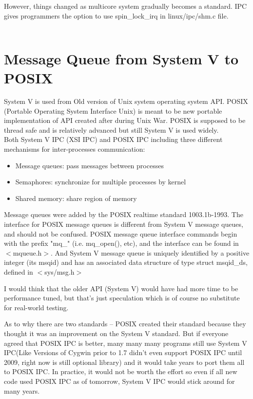 \documentclass[10pt,preprint]{sigplanconf}
\begin{document}
However, things changed as multicore system gradually becomes a standard. IPC gives programmers the option to use spin\_lock\_irq in linux/ipc/shm.c file.\\\\

\section{Message Queue from System V to POSIX}

System V is used from Old version of Unix system operating system API. POSIX (Portable Operating System Interface Unix) is meant to be new portable implementation of API created after during Unix War. POSIX is supposed to be thread safe and is relatively advanced but still System V is used widely.\\
Both System V IPC (XSI IPC) and POSIX IPC including three different mechanisms for inter-processes communication:
\begin{itemize}
	\item Message queues: pass messages between processes
	\item Semaphores: synchronize for multiple processes by kernel
	\item Shared memory: share region of memory
\end{itemize}
Message queues were added by the POSIX realtime standard 1003.1b-1993. The interface for POSIX message queues is different from System V message queues, and should not be confused. POSIX message queue interface commands begin with the prefix "mq\_" (i.e. mq\_open(), etc), and the interface can be found in $<$mqueue.h$>$. And System V message queue is uniquely identified by a positive integer (its msqid) and has an associated data structure of type struct msqid\_ds, defined in $<$sys/msg.h$>$

I would think that the older API (System V) would have had more time to be performance tuned, but that's just speculation which is of course no substitute for real-world testing.

As to why there are two standards -- POSIX created their standard because they thought it was an improvement on the System V standard. But if everyone agreed that POSIX IPC is better, many many many programs still use System V IPC(Like Versions of Cygwin prior to 1.7 didn't even support POSIX IPC until 2009, right now is still optional library) and it would take years to port them all to POSIX IPC. In practice, it would not be worth the effort so even if all new code used POSIX IPC as of tomorrow, System V IPC would stick around for many years.


% 
\end{document}
